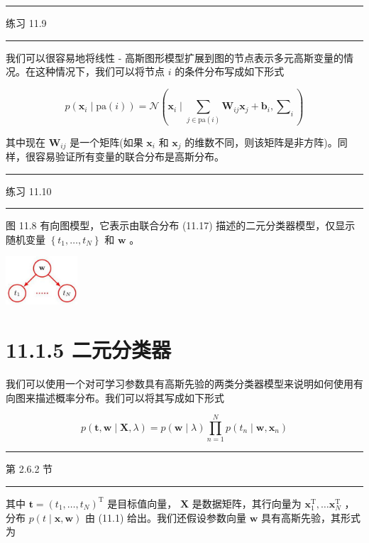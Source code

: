 \documentclass[10pt]{article}
\newcommand{\HRule}{\begin{center}\rule{0.9\linewidth}{0.2mm}\end{center}}
\begin{document}
\HRule

练习 11.9

\HRule

我们可以很容易地将线性 - 高斯图形模型扩展到图的节点表示多元高斯变量的情况。在这种情况下，我们可以将节点 \(i\) 的条件分布写成如下形式

\[
p\left( {{\mathbf{x}}_{i} \mid  \mathrm{{pa}}\left( i\right) }\right)  = \mathcal{N}\left( {{\mathbf{x}}_{i} \mid  \mathop{\sum }\limits_{{j \in  \mathrm{{pa}}\left( i\right) }}{\mathbf{W}}_{ij}{\mathbf{x}}_{j} + {\mathbf{b}}_{i},{\mathbf{\sum }}_{i}}\right)  \tag{11.16}
\]

其中现在 \({\mathbf{W}}_{ij}\) 是一个矩阵(如果 \({\mathbf{x}}_{i}\) 和 \({\mathbf{x}}_{j}\) 的维数不同，则该矩阵是非方阵)。同样，很容易验证所有变量的联合分布是高斯分布。

\HRule

练习 11.10

\HRule

图 11.8 有向图模型，它表示由联合分布 (11.17) 描述的二元分类器模型，仅显示随机变量 \(\left\{  {{t}_{1},\ldots ,{t}_{N}}\right\}\) 和 \(\mathbf{w}\) 。

\begin{center}
\includegraphics[max width=0.2\textwidth]{images/0194e279-9b28-703a-88f4-c3ac21e2010d_353_1287_346_264_178_0.jpg}
\end{center}
\hspace*{3em} 

\section*{11.1.5 二元分类器}

我们可以使用一个对可学习参数具有高斯先验的两类分类器模型来说明如何使用有向图来描述概率分布。我们可以将其写成如下形式

\[
p\left( {\mathbf{t},\mathbf{w} \mid  \mathbf{X},\lambda }\right)  = p\left( {\mathbf{w} \mid  \lambda }\right) \mathop{\prod }\limits_{{n = 1}}^{N}p\left( {{t}_{n} \mid  \mathbf{w},{\mathbf{x}}_{n}}\right)  \tag{11.17}
\]

\HRule

第 2.6.2 节

\HRule

其中 \(\mathbf{t} = {\left( {t}_{1},\ldots ,{t}_{N}\right) }^{\mathrm{T}}\) 是目标值向量， \(\mathbf{X}\) 是数据矩阵，其行向量为 \({\mathbf{x}}_{1}^{\mathrm{T}},\ldots {\mathbf{x}}_{N}^{\mathrm{T}}\) ，分布 \(p\left( {t \mid  \mathbf{x},\mathbf{w}}\right)\) 由 (11.1) 给出。我们还假设参数向量 \(\mathbf{w}\) 具有高斯先验，其形式为
\end{document}
